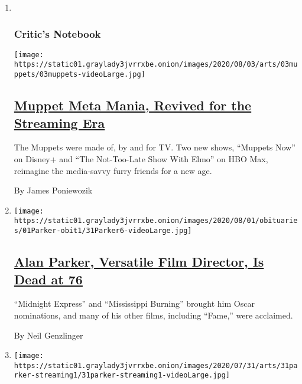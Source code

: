 \begin{enumerate}
\def\labelenumi{\arabic{enumi}.}
\item ~
  \hypertarget{critics-notebook}{%
  \subsubsection{Critic's Notebook}\label{critics-notebook}}

  \texttt{[image: https://static01.graylady3jvrrxbe.onion/images/2020/08/03/arts/03muppets/03muppets-videoLarge.jpg]}

  \hypertarget{muppet-meta-mania-revived-for-the-streaming-era}{%
  \subsection{\texorpdfstring{\href{/2020/07/31/arts/television/muppets-now.html}{Muppet
  Meta Mania, Revived for the Streaming
  Era}}{Muppet Meta Mania, Revived for the Streaming Era}}\label{muppet-meta-mania-revived-for-the-streaming-era}}

  The Muppets were made of, by and for TV. Two new shows, ``Muppets
  Now'' on Disney+ and ``The Not-Too-Late Show With Elmo'' on HBO Max,
  reimagine the media-savvy furry friends for a new age.

  By James Poniewozik
\item
  \texttt{[image: https://static01.graylady3jvrrxbe.onion/images/2020/08/01/obituaries/01Parker-obit1/31Parker6-videoLarge.jpg]}

  \hypertarget{alan-parker-versatile-film-director-is-dead-at-76}{%
  \subsection{\texorpdfstring{\href{/2020/07/31/movies/alan-parker-versatile-film-director-is-dead-at-76.html}{Alan
  Parker, Versatile Film Director, Is Dead at
  76}}{Alan Parker, Versatile Film Director, Is Dead at 76}}\label{alan-parker-versatile-film-director-is-dead-at-76}}

  ``Midnight Express'' and ``Mississippi Burning'' brought him Oscar
  nominations, and many of his other films, including ``Fame,'' were
  acclaimed.

  By Neil Genzlinger
\item
  \texttt{[image: https://static01.graylady3jvrrxbe.onion/images/2020/07/31/arts/31parker-streaming1/31parker-streaming1-videoLarge.jpg]}

  \hypertarget{where-to-stream-alan-parkers-best-movies}{%
}
\end{enumerate}
